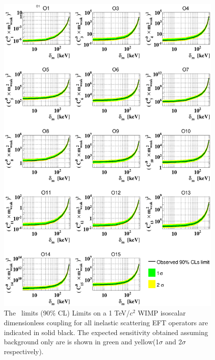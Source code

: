 \begin{figure}
\begin{minipage}{1.\linewidth}
\centerline{\includegraphics[width=\textwidth,height=\textheight,keepaspectratio]{Figures/FinalInelastic.eps}}
\end{minipage}
\caption{The \Xehund\ limits (90\% CL) Limits on a 1 TeV/$c^2$ WIMP isoscalar dimensionless coupling for all inelastic scattering EFT operators are indicated in solid black. The expected sensitivity obtained assuming background only are is shown in green and yellow(1$\sigma$ and 2$\sigma$ respectively). }
\label{fig:InelasticLimit}
\end{figure}

\FloatBarrier

